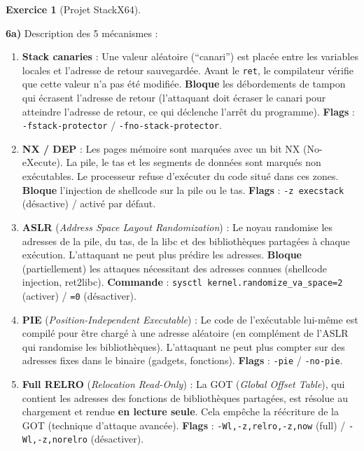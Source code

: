 \documentclass[a4paper,11pt]{article}
\theoremstyle{plain}
\theoremstyle{definition}
\newtheorem{exercice}{Exercice}
\begin{document}
\begin{exercice}[Projet StackX64]
\begin{correction}
\textbf{6a)} Description des 5 mécanismes :

\begin{enumerate}
\item \textbf{Stack canaries} : Une valeur aléatoire (``canari'') est placée entre les variables locales et l'adresse de retour sauvegardée. Avant le \texttt{ret}, le compilateur vérifie que cette valeur n'a pas été modifiée. \textbf{Bloque} les débordements de tampon qui écrasent l'adresse de retour (l'attaquant doit écraser le canari pour atteindre l'adresse de retour, ce qui déclenche l'arrêt du programme). \textbf{Flags} : \texttt{-fstack-protector} / \texttt{-fno-stack-protector}.

\item \textbf{NX / DEP} : Les pages mémoire sont marquées avec un bit NX (No-eXecute). La pile, le tas et les segments de données sont marqués non exécutables. Le processeur refuse d'exécuter du code situé dans ces zones. \textbf{Bloque} l'injection de shellcode sur la pile ou le tas. \textbf{Flags} : \texttt{-z execstack} (désactive) / activé par défaut.

\item \textbf{ASLR} (\textit{Address Space Layout Randomization}) : Le noyau randomise les adresses de la pile, du tas, de la libc et des bibliothèques partagées à chaque exécution. L'attaquant ne peut plus prédire les adresses. \textbf{Bloque} (partiellement) les attaques nécessitant des adresses connues (shellcode injection, ret2libc). \textbf{Commande} : \texttt{sysctl kernel.randomize\_va\_space=2} (activer) / \texttt{=0} (désactiver).

\item \textbf{PIE} (\textit{Position-Independent Executable}) : Le code de l'exécutable lui-même est compilé pour être chargé à une adresse aléatoire (en complément de l'ASLR qui randomise les bibliothèques). L'attaquant ne peut plus compter sur des adresses fixes dans le binaire (gadgets, fonctions). \textbf{Flags} : \texttt{-pie} / \texttt{-no-pie}.

\item \textbf{Full RELRO} (\textit{Relocation Read-Only}) : La GOT (\textit{Global Offset Table}), qui contient les adresses des fonctions de bibliothèques partagées, est résolue au chargement et rendue \textbf{en lecture seule}. Cela empêche la réécriture de la GOT (technique d'attaque avancée). \textbf{Flags} : \texttt{-Wl,-z,relro,-z,now} (full) / \texttt{-Wl,-z,norelro} (désactiver).
\end{enumerate}


\end{correction}
\end{exercice}
\end{document}
